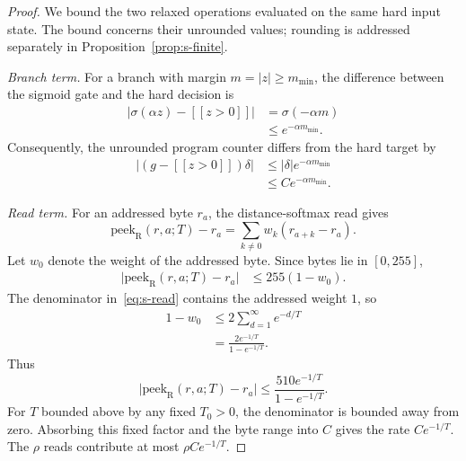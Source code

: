 \documentclass[letterpaper]{article} %
\begin{document}
\begin{proof}
We bound the two relaxed operations evaluated
on the same hard input state. The bound concerns
their unrounded values; rounding is addressed
separately in Proposition~\ref{prop:s-finite}.

\textit{Branch term.}
For a branch with margin $m=|z|\ge m_{\min}$,
the difference between the sigmoid gate and the
hard decision is
\begin{equation}
\begin{aligned}
\big|\sigma(\alpha z)-[\![z>0]\!]\big|
&=\sigma(-\alpha m)\\
&\le e^{-\alpha m_{\min}}.
\end{aligned}
\label{eq:s-gate}
\end{equation}
Consequently, the unrounded program counter
differs from the hard target by
\begin{equation}
\begin{aligned}
\big|(g-[\![z>0]\!])\delta\big|
&\le|\delta|e^{-\alpha m_{\min}}\\
&\le C e^{-\alpha m_{\min}}.
\end{aligned}
\label{eq:s-branchterm}
\end{equation}

\textit{Read term.}
For an addressed byte $r_a$, the
distance-softmax read gives
\begin{equation}
\mathrm{peek}_{\mathrm{R}}(r,a;T)-r_a
=\sum_{k\ne0}w_k(r_{a+k}-r_a).
\end{equation}
Let $w_0$ denote the weight of the addressed
byte. Since bytes lie in $[0,255]$,
\begin{equation}
\begin{aligned}
\big|\mathrm{peek}_{\mathrm{R}}(r,a;T)-r_a\big|
&\le255(1-w_0).
\end{aligned}
\end{equation}
The denominator in~\eqref{eq:s-read} contains
the addressed weight $1$, so
\begin{equation}
\begin{aligned}
1-w_0
&\le2\sum_{d=1}^{\infty}e^{-d/T}\\
&=\frac{2e^{-1/T}}{1-e^{-1/T}}.
\end{aligned}
\label{eq:s-readmass}
\end{equation}
Thus
\begin{equation}
\big|\mathrm{peek}_{\mathrm{R}}(r,a;T)-r_a\big|
\le\frac{510e^{-1/T}}{1-e^{-1/T}}.
\label{eq:s-readterm}
\end{equation}
For $T$ bounded above by any fixed $T_0>0$,
the denominator is bounded away from zero.
Absorbing this fixed factor and the byte range
into $C$ gives the rate $C e^{-1/T}$.
The $\rho$ reads contribute at most
$\rho C e^{-1/T}$.


\end{proof}
\end{document}
